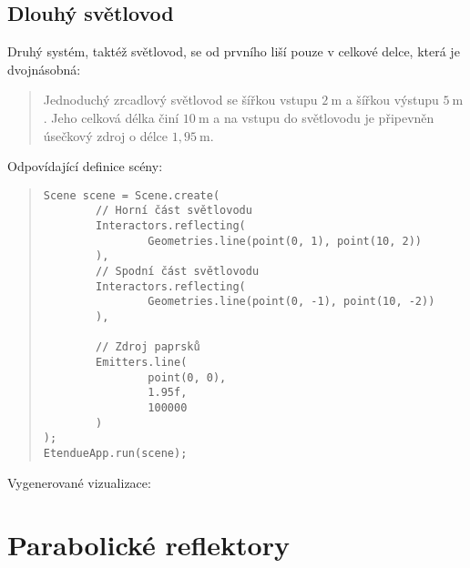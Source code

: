 

\subsection{Dlouhý světlovod}

Druhý systém, taktéž světlovod, se od prvního liší pouze v celkové delce, která je dvojnásobná:

\begin{quote}
    Jednoduchý zrcadlový světlovod se šířkou vstupu $2\ \mathrm{m}$ a šířkou výstupu $5\ \mathrm{m}$. Jeho celková délka činí $10\ \mathrm{m}$ a na vstupu do světlovodu je připevněn úsečkový zdroj o délce $1,95\ \mathrm{m}$.
\end{quote}

Odpovídající definice scény:

\begin{minipage}{\textwidth}\begin{quote}\begin{lstlisting}
Scene scene = Scene.create(
        // Horní část světlovodu
        Interactors.reflecting(
                Geometries.line(point(0, 1), point(10, 2))
        ),
        // Spodní část světlovodu
        Interactors.reflecting(
                Geometries.line(point(0, -1), point(10, -2))
        ),

        // Zdroj paprsků
        Emitters.line(
                point(0, 0),
                1.95f,
                100000
        )
);
EtendueApp.run(scene);
\end{lstlisting}\end{quote}\end{minipage}

Vygenerované vizualizace:




\section{Parabolické reflektory}
\label{sec:parabolickereflektory}

